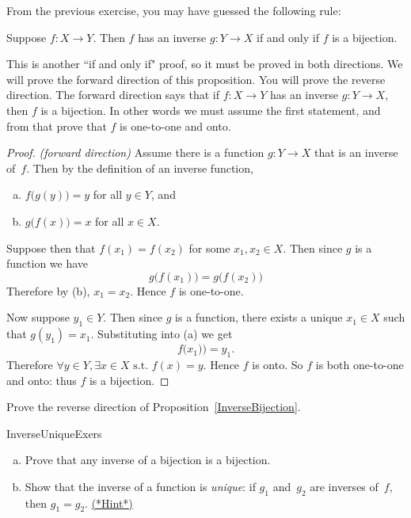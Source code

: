 From the previous exercise, you may have guessed the following rule:

 \begin{thm} \label{InverseBijection}
 Suppose $f\colon X \to Y$. Then $f$ has an inverse $g \colon Y \to X$ if and only if $f$ is a bijection.
 \end{thm}
 
 This is another ``if and only if" proof, so it must be proved in both directions. We will prove the forward direction of this proposition.  You will prove the reverse direction.  The forward direction says that if $f \colon X \to Y$ has an inverse $g \colon Y \to X$, then $f$ is a bijection.  In other words we must assume the first statement, and from that prove that $f$ is one-to-one and onto.

 
 \begin{proof} \emph{(forward direction)}
 Assume there is a function $g \colon Y \to X$ that is an inverse of~$f$. Then by the definition of an inverse function,
\begin{enumerate}[(a)]
\item $f \bigl( g(y) \bigr) = y$ for all $y \in Y$, and
\item $g \bigl( f(x) \bigr) = x$ for all $x \in X$.
\end{enumerate}
Suppose then that $f(x_1) = f(x_2)$ for some $x_1, x_2 \in X$.  Then since $g$ is a function we have
$$g \bigl( f(x_1) \bigr) = g \bigl( f(x_2) \bigr)$$
Therefore by (b), $x_1 = x_2$. Hence $f$ is one-to-one.

\noindent
Now suppose $y_1 \in Y$.  Then since $g$ is a function, there exists a unique  $x_1 \in X$ such that $g(y_1) = x_1$.  Substituting into (a) we get
\[f \bigl(x_1) \bigr) = y_1.\]
Therefore $\forall y \in Y, \exists x \in X \mbox{ s.t. } f(x) = y$.  Hence $f$ is onto.
So $f$ is both one-to-one and onto: thus $f$ is a bijection.
 \end{proof}

\begin{exercise}{}
Prove the reverse direction of Proposition~\ref{InverseBijection}.
\end{exercise}

 \begin{exercise}{InverseUniqueExers} 
 \begin{enumerate}[(a)]
 \item \label{InverseUniqueExers-bij}
 Prove that any inverse of a bijection is a bijection.
 \item \label{InverseUniqueExers-unique}
 Show that the inverse of a function is \emph{unique}: if $g_1$ and~$g_2$ are inverses of~$f$, then $g_1 = g_2$.
\hyperref[sec:functions:hints]{(*Hint*)} 
 \end{enumerate}
 \end{exercise}

